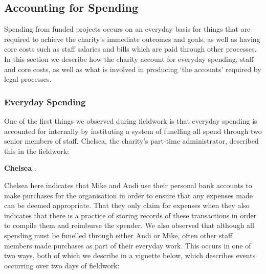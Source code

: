 \subsection{Accounting for Spending}
Spending from funded projects occurs on an everyday basis for things that are required to achieve the charity's immediate outcomes and goals, as well as having core costs such as staff salaries and bills which are paid through other processes. In this section we describe how the charity account for everyday spending, staff and core costs, as well as what is involved in producing `the accounts' required by legal processes.

\subsubsection{Everyday Spending}
One of the first things we observed during fieldwork is that everyday spending is accounted for internally by instituting a system of funelling all spend through two senior members of staff. Chelsea, the charity's part-time administrator, described this in the fieldwork:

\textbf{Chelsea} .

Chelsea here indicates that Mike and Andi use their personal bank accounts to make purchases for the organisation in order to ensure that any expenses made can be deemed appropriate. That they only claim for expenses when they  also indicates that there is a practice of storing records of these transactions in order to compile them and reimburse the spender. We also observed that although all spending must be funelled through either Andi or Mike, often other staff members made purchases as part of their everyday work. This occurs in one of two ways, both of which we describe in a vignette below, which describes events occurring over two days of fieldwork:

